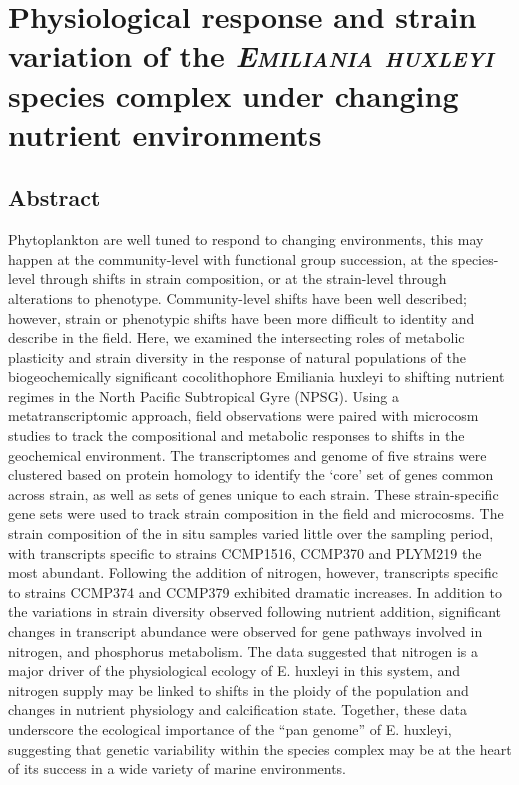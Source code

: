 

\chapter{Physiological response and strain variation of the \textsl{\textsc{Emiliania huxleyi}} species complex under changing nutrient environments}
\raggedbottom

\clearpage


\section{Abstract}
Phytoplankton are well tuned to respond to changing environments, this may happen at the community-level with functional group succession, at the species-level through shifts in strain composition, or at the strain-level through alterations to phenotype. Community-level shifts have been well described; however, strain or phenotypic shifts have been more difficult to identity and describe in the field. Here, we examined the intersecting roles of metabolic plasticity and strain diversity in the response of natural populations of the biogeochemically significant cocolithophore Emiliania huxleyi to shifting nutrient regimes in the North Pacific Subtropical Gyre (NPSG). Using a metatranscriptomic approach, field observations were paired with microcosm studies to track the compositional and metabolic responses to shifts in the geochemical environment. The transcriptomes and genome of five strains were clustered based on protein homology to identify the ‘core’ set of genes common across strain, as well as sets of genes unique to each strain. These strain-specific gene sets were used to track strain composition in the field and microcosms. The strain composition of the in situ samples varied little over the sampling period, with transcripts specific to strains CCMP1516, CCMP370 and PLYM219 the most abundant.  Following the addition of nitrogen, however, transcripts specific to strains CCMP374 and CCMP379 exhibited dramatic increases. In addition to the variations in strain diversity observed following nutrient addition, significant changes in transcript abundance were observed for gene pathways involved in nitrogen, and phosphorus metabolism.  The data suggested that nitrogen is a major driver of the physiological ecology of E. huxleyi in this system, and nitrogen supply may be linked to shifts in the ploidy of the population and changes in nutrient physiology and calcification state. Together, these data underscore the ecological importance of the “pan genome” of E. huxleyi, suggesting that genetic variability within the species complex may be at the heart of its success in a wide variety of marine environments. 
